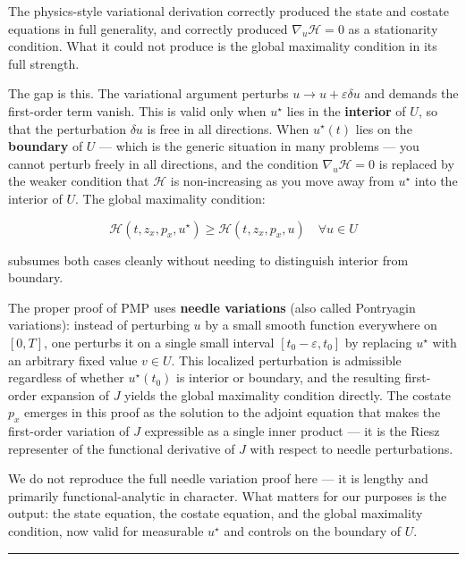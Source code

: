 \documentclass{article}
\begin{document}
\begin{mathrequirementsbox}
The physics-style variational derivation correctly produced the state and costate equations in full generality, and correctly produced $\nabla_u \mathcal{H} = 0$ as a stationarity condition. What it could not produce is the global maximality condition in its full strength.

The gap is this. The variational argument perturbs $u \to u + \varepsilon \delta u$ and demands the first-order term vanish. This is valid only when $u^\star$ lies in the \textbf{interior} of $U$, so that the perturbation $\delta u$ is free in all directions. When $u^\star(t)$ lies on the \textbf{boundary} of $U$ — which is the generic situation in many problems — you cannot perturb freely in all directions, and the condition $\nabla_u \mathcal{H} = 0$ is replaced by the weaker condition that $\mathcal{H}$ is non-increasing as you move away from $u^\star$ into the interior of $U$. The global maximality condition:

$$\mathcal{H}(t, z_x, p_x, u^\star) \geq \mathcal{H}(t, z_x, p_x, u) \quad \forall u \in U$$

subsumes both cases cleanly without needing to distinguish interior from boundary.

The proper proof of PMP uses \textbf{needle variations} (also called Pontryagin variations): instead of perturbing $u$ by a small smooth function everywhere on $[0,T]$, one perturbs it on a single small interval $[t_0 - \varepsilon, t_0]$ by replacing $u^\star$ with an arbitrary fixed value $v \in U$. This localized perturbation is admissible regardless of whether $u^\star(t_0)$ is interior or boundary, and the resulting first-order expansion of $J$ yields the global maximality condition directly. The costate $p_x$ emerges in this proof as the solution to the adjoint equation that makes the first-order variation of $J$ expressible as a single inner product — it is the Riesz representer of the functional derivative of $J$ with respect to needle perturbations.

We do not reproduce the full needle variation proof here — it is lengthy and primarily functional-analytic in character. What matters for our purposes is the output: the state equation, the costate equation, and the global maximality condition, now valid for measurable $u^\star$ and controls on the boundary of $U$.
\end{mathrequirementsbox}

\medskip\hrule\medskip
\end{document}
